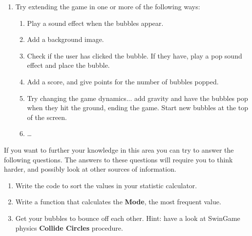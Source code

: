 \begin{enumerate}
  \item Try extending the game in one or more of the following ways:
  
 \begin{enumerate}
  \item Play a sound effect when the bubbles appear.
  \item Add a background image.
  \item Check if the user has clicked the bubble. If they have, play a pop sound effect and place the bubble.
  \item Add a score, and give points for the number of bubbles popped.
  \item Try changing the game dynamics... add gravity and have the bubbles pop when they hit the ground, ending the game. Start new bubbles at the top of the screen.
  \item \ldots
 \end{enumerate}
  
\end{enumerate}

\bigskip

If you want to further your knowledge in this area you can try to answer the following questions. The answers to these questions will require you to think harder, and possibly look at other sources of information.
\begin{enumerate}
  \item Write the code to sort the values in your statistic calculator.
  \item Write a function that calculates the \textbf{Mode}, the most frequent value.
  \item Get your bubbles to bounce off each other. Hint: have a look at SwinGame physics \textbf{Collide Circles} procedure.
  
  
  
  
\end{enumerate}